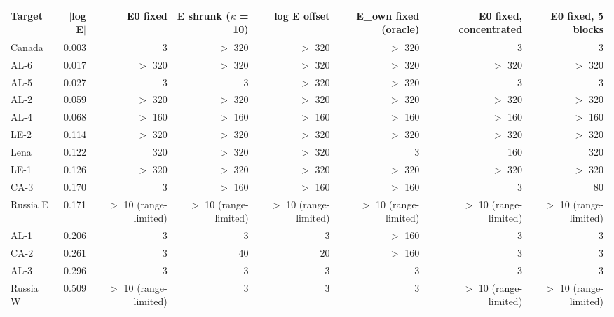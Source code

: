 \begin{tabular}{lrrrrrrr}
\toprule
Target & $|$log E$|$ & E0 fixed & E shrunk ($\kappa$ = 10) & log E offset & E\_own fixed (oracle) & E0 fixed, concentrated & E0 fixed, 5 blocks \\
\midrule
Canada & 0.003 & 3 & $>$ 320 & $>$ 320 & $>$ 320 & 3 & 3 \\
AL-6 & 0.017 & $>$ 320 & $>$ 320 & $>$ 320 & $>$ 320 & $>$ 320 & $>$ 320 \\
AL-5 & 0.027 & 3 & 3 & $>$ 320 & $>$ 320 & 3 & 3 \\
AL-2 & 0.059 & $>$ 320 & $>$ 320 & $>$ 320 & $>$ 320 & $>$ 320 & $>$ 320 \\
AL-4 & 0.068 & $>$ 160 & $>$ 160 & $>$ 160 & $>$ 160 & $>$ 160 & $>$ 160 \\
LE-2 & 0.114 & $>$ 320 & $>$ 320 & $>$ 320 & $>$ 320 & $>$ 320 & $>$ 320 \\
Lena & 0.122 & 320 & $>$ 320 & $>$ 320 & 3 & 160 & 320 \\
LE-1 & 0.126 & $>$ 320 & $>$ 320 & $>$ 320 & $>$ 320 & $>$ 320 & $>$ 320 \\
CA-3 & 0.170 & 3 & $>$ 160 & $>$ 160 & $>$ 160 & 3 & 80 \\
Russia E & 0.171 & $>$ 10 (range-limited) & $>$ 10 (range-limited) & $>$ 10 (range-limited) & $>$ 10 (range-limited) & $>$ 10 (range-limited) & $>$ 10 (range-limited) \\
AL-1 & 0.206 & 3 & 3 & 3 & $>$ 160 & 3 & 3 \\
CA-2 & 0.261 & 3 & 40 & 20 & $>$ 160 & 3 & 3 \\
AL-3 & 0.296 & 3 & 3 & 3 & 3 & 3 & 3 \\
Russia W & 0.509 & $>$ 10 (range-limited) & 3 & 3 & 3 & $>$ 10 (range-limited) & $>$ 10 (range-limited) \\
\bottomrule
\end{tabular}
